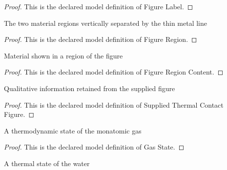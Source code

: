 \begin{proof}
  This is the declared model definition of Figure Label.
\end{proof}
\begin{definition}
  \label{def:physics:phyx-mini-0406:phyxminiproblems-problemphyxmini0406-figureregion}
  The two material regions vertically separated by the thin metal line
\end{definition}
\begin{proof}
  This is the declared model definition of Figure Region.
\end{proof}
\begin{definition}
  \label{def:physics:phyx-mini-0406:phyxminiproblems-problemphyxmini0406-figureregioncontent}
  Material shown in a region of the figure
\end{definition}
\begin{proof}
  This is the declared model definition of Figure Region Content.
\end{proof}
\begin{definition}
  \label{def:physics:phyx-mini-0406:phyxminiproblems-problemphyxmini0406-suppliedthermalcontactfigure}
  Qualitative information retained from the supplied figure
\end{definition}
\begin{proof}
  This is the declared model definition of Supplied Thermal Contact Figure.
\end{proof}
\begin{definition}
  \label{def:physics:phyx-mini-0406:phyxminiproblems-problemphyxmini0406-gasstate}
  A thermodynamic state of the monatomic gas
\end{definition}
\begin{proof}
  This is the declared model definition of Gas State.
\end{proof}
\begin{definition}
  \label{def:physics:phyx-mini-0406:phyxminiproblems-problemphyxmini0406-waterstate}
  A thermal state of the water
\end{definition}
